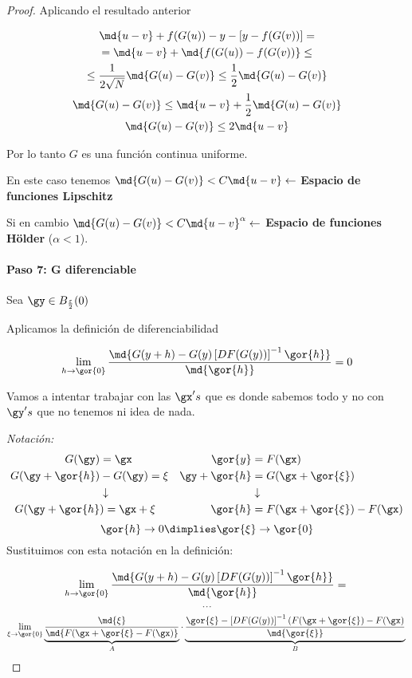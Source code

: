 \begin{proof}
Aplicando el resultado anterior   
 
  \begin{gather*}
\md{u-v} + f(G(u)) - y - [y -f(G(v))] =\\
= \md{u-v} + \md{f(G(u)) - f(G(v))} \leq \\
\leq \frac{1}{2\sqrt{N}} \md{G(u)-G(v)} \leq \frac{1}{2}  \md{G(u)-G(v)}\\
\md{G(u)-G(v)}\leq \md{u-v} + \frac{1}{2}\md{G(u)-G(v)}\\
\md{G(u)-G(v)} \leq 2 \md{u-v}
  \end{gather*}
  
  Por lo tanto $G$ es una función continua uniforme.
  
  \begin{remark}
  En este caso tenemos $\md{G(u)-G(v)} < C\md{u-v} \leftarrow $ \textbf{Espacio de funciones Lipschitz}
  
  Si en cambio $\md{G(u)-G(v)} < C\md{u-v}^\alpha \leftarrow $ \textbf{Espacio de funciones Hölder} ($\alpha<1$).
  \end{remark}
  
  \paragraph{Paso 7: G diferenciable}  Sea $\gy \in B_{\frac{\varepsilon}{2}}(0)$
  
  Aplicamos la definición de diferenciabilidad
  
  \[ \lim_{h \rightarrow \gor{0}}\frac{\md{G(y+h) - G(y) \left[DF(G(y))\right]^{-1} \gor{h}}}{\md{\gor{h}}} = 0 \]
  
  Vamos a intentar trabajar con las $\gx's$ que es donde sabemos todo y no con $\gy's$ que no tenemos ni idea de nada.
  
  \emph{Notación:}
  \begin{align*}
G(\gy) &= \gx & \gor{y} &= F(\gx)\\
G(\gy + \gor{h}) &- G(\gy) = \xi & \gy + \gor{h} &= G(\gx + \gor{\xi})\\
&\downarrow&\ &\downarrow\\
G(\gy + \gor{h}&) = \gx + \xi & \gor{h} &= F(\gx + \gor{\xi}) - F(\gx)
\end{align*}
$$\gor{h} \rightarrow 0 \dimplies \gor{\xi} \rightarrow \gor{0}$$
  Sustituimos con esta notación en la definición:
  
 
  $$\lim_{h \rightarrow \gor{0}}\frac{\md{G(y+h) - G(y) \left[DF(G(y))\right]^{-1} \gor{h}}}{\md{\gor{h}}} = \\$$
  $$...\\$$
  $$\lim_{\xi\rightarrow \gor{0}} \underbrace{\frac{\md{\xi}}{\md{F(\gx + \gor{\xi} - F(\gx)}}}_{A} %
  \cdot \underbrace{\frac{\gor{\xi} - \left[DF(G(y))\right]^{-1} (F(\gx +\gor{\xi}) - F(\gx)}{\md{\gor{\xi}}}}_{B}\\   $$
  

\end{proof}
